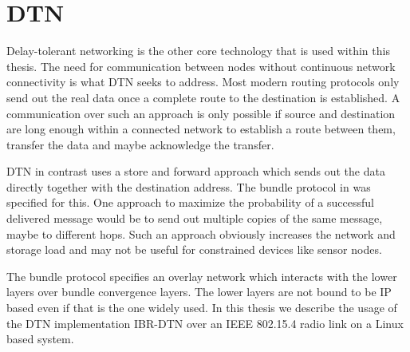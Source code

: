 \section{DTN}
\label{introdtn}
Delay-tolerant networking is the other core technology that is used within this
thesis. The need for communication between nodes without continuous network
connectivity is what DTN seeks to address. Most modern routing protocols only
send out the real data once a complete route to the destination is established.
A communication over such an approach is only possible if source and destination
are long enough within a connected network to establish a route between them,
transfer the data and maybe acknowledge the transfer.

DTN in contrast uses a store and forward approach which sends out the data
directly together with the destination address. The bundle protocol in
\cite{RFC5050} was specified for this. One approach to maximize the probability
of a successful delivered message would be to send out multiple copies of the
same message, maybe to different hops. Such an approach obviously increases the
network and storage load and may not be useful for constrained devices like
sensor nodes.

The bundle protocol specifies an overlay network which interacts with the lower
layers over bundle convergence layers. The lower layers are not bound to be IP
based even if that is the one widely used. In this thesis we describe the usage
of the DTN implementation IBR-DTN over an IEEE 802.15.4 radio link on a Linux
based system.
